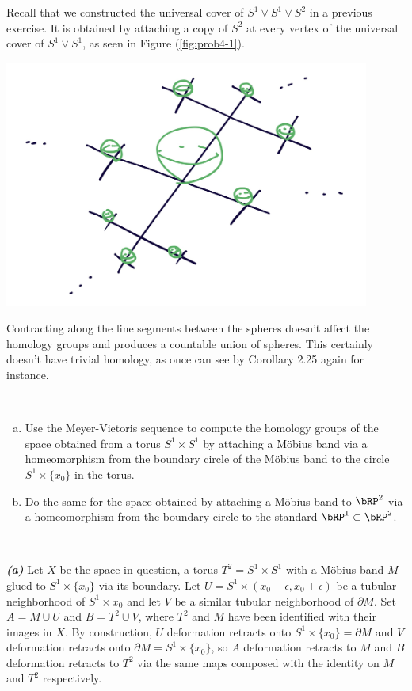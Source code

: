 \begin{homework}[e]
\begin{prf}
    Recall that we constructed the universal cover of $S^1\vee S^1\vee S^2$ in a previous exercise. It is obtained by attaching a copy of $S^2$ at every vertex of the universal cover of $S^1\vee S^1$, as seen in Figure (\ref{fig:prob4-1}).
    \begin{center}
      \includegraphics[width=12cm]{figures/hwk9-fig3.png}
      \label{fig:prob4-1}
    \end{center}
    Contracting along the line segments between the spheres doesn't affect the homology groups and produces a countable union of spheres. This certainly doesn't have trivial homology, as once can see by Corollary 2.25 again for instance.
  \end{prf}
  $ $
  \begin{enumerate}[(a)]
    \item Use the Meyer-Vietoris sequence to compute the homology groups of the space obtained from a torus $S^1\times S^1$ by attaching a M\"obius band via a homeomorphism from the boundary circle of the M\"obius band to the circle $S^1\times \{x_0\}$ in the torus.
    \item Do the same for the space obtained by attaching a M\"obius band to $\bRP^2$ via a homeomorphism from the boundary circle to the standard $\bRP^1 \subset \bRP^2$.
  \end{enumerate}
  \begin{prf}$ $

    \noindent \textbf{\emph{(a)}}\hspace{1em} Let $X$ be the space in question, a torus $T^2 = S^1\times S^1$ with a M\"obius band $M$ glued to $S^1\times \{x_0\}$ via its boundary. Let $U = S^1 \times (x_0 - \epsilon, x_0 + \epsilon)$ be a tubular neighborhood of $S^1\times x_0$ and let $V$ be a similar tubular neighborhood of $\partial M$. Set $A = M \cup U$ and $B = T^2 \cup V$, where $T^2$ and $M$ have been identified with their images in $X$. By construction, $U$ deformation retracts onto $S^1 \times \{x_0\} = \partial M$ and $V$ deformation retracts onto $\partial M = S^1\times \{x_0\}$, so $A$ deformation retracts to $M$ and $B$ deformation retracts to $T^2$ via the same maps composed with the identity on $M$ and $T^2$ respectively.


\end{prf}
\end{homework}
